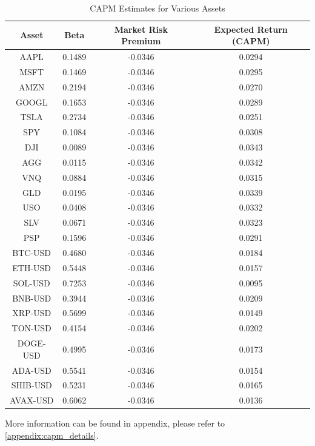 \begin{table}[h]
\centering
\begin{tabular}{|c|c|c|c|}
\hline
\textbf{Asset} & \textbf{Beta} & \textbf{Market Risk Premium} & \textbf{Expected Return (CAPM)} \\
\hline
AAPL & 0.1489 & -0.0346 & 0.0294 \\
MSFT & 0.1469 & -0.0346 & 0.0295 \\
AMZN & 0.2194 & -0.0346 & 0.0270 \\
GOOGL & 0.1653 & -0.0346 & 0.0289 \\
TSLA & 0.2734 & -0.0346 & 0.0251 \\
SPY & 0.1084 & -0.0346 & 0.0308 \\
DJI & 0.0089 & -0.0346 & 0.0343 \\
AGG & 0.0115 & -0.0346 & 0.0342 \\
VNQ & 0.0884 & -0.0346 & 0.0315 \\
GLD & 0.0195 & -0.0346 & 0.0339 \\
USO & 0.0408 & -0.0346 & 0.0332 \\
SLV & 0.0671 & -0.0346 & 0.0323 \\
PSP & 0.1596 & -0.0346 & 0.0291 \\
BTC-USD & 0.4680 & -0.0346 & 0.0184 \\
ETH-USD & 0.5448 & -0.0346 & 0.0157 \\
SOL-USD & 0.7253 & -0.0346 & 0.0095 \\
BNB-USD & 0.3944 & -0.0346 & 0.0209 \\
XRP-USD & 0.5699 & -0.0346 & 0.0149 \\
TON-USD & 0.4154 & -0.0346 & 0.0202 \\
DOGE-USD & 0.4995 & -0.0346 & 0.0173 \\
ADA-USD & 0.5541 & -0.0346 & 0.0154 \\
SHIB-USD & 0.5231 & -0.0346 & 0.0165 \\
AVAX-USD & 0.6062 & -0.0346 & 0.0136 \\
\hline
\end{tabular}
\caption{CAPM Estimates for Various Assets}
\label{tab:capm}
\end{table}


More information can be found in appendix, please refer to \ref{appendix:capm_details}.

